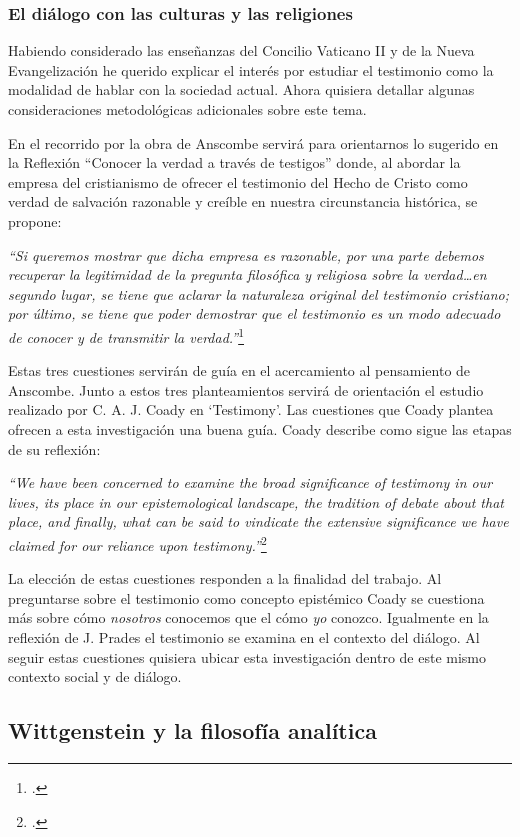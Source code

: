 \documentclass[../main.tex]{subfiles}
\begin{document}
\subsubsection{El diálogo con las culturas y las religiones}
Habiendo considerado las enseñanzas del Concilio Vaticano II y de la Nueva Evangelización he querido explicar el interés por estudiar el testimonio como la modalidad de hablar con la sociedad actual. Ahora quisiera detallar algunas consideraciones metodológicas adicionales sobre este tema.

En el recorrido por la obra de Anscombe servirá para orientarnos lo sugerido en la Reflexión ``Conocer la verdad a través de testigos'' donde, al abordar la empresa del cristianismo de ofrecer el testimonio del Hecho de Cristo como verdad de salvación razonable y creíble en nuestra circunstancia histórica, se propone:

\emph{
``Si queremos mostrar que dicha empresa es razonable, por una parte debemos recuperar la legitimidad de la pregunta filosófica y religiosa sobre la verdad\ldots en segundo lugar, se tiene que aclarar la naturaleza original del testimonio cristiano; por último, se tiene que poder demostrar que el testimonio es un modo adecuado de conocer y de transmitir la verdad.''}\footcite[267]{pradesmulticr}

Estas tres cuestiones servirán de guía en el acercamiento al pensamiento de Anscombe. Junto a estos tres planteamientos servirá de orientación el estudio realizado por C. A. J. Coady en `Testimony'. Las cuestiones que Coady plantea ofrecen a esta investigación una buena guía. Coady describe como sigue las etapas de su reflexión:

\emph{``We have been concerned to examine the broad significance of testimony in our lives, its place in our epistemological landscape, the tradition of debate about that place, and finally, what can be said to vindicate the extensive significance we have claimed for our reliance upon testimony.''}\footcite[175]{testcoady}

La elección de estas cuestiones responden a la finalidad del trabajo. Al preguntarse sobre el testimonio como concepto epistémico Coady se cuestiona más sobre cómo \emph{nosotros} conocemos que el cómo \emph{yo} conozco. Igualmente en la reflexión de J. Prades el testimonio se examina en el contexto del diálogo. Al seguir estas cuestiones quisiera ubicar esta investigación dentro de este mismo contexto social y de diálogo.

\subsection{Wittgenstein y la filosofía analítica}
\end{document}
